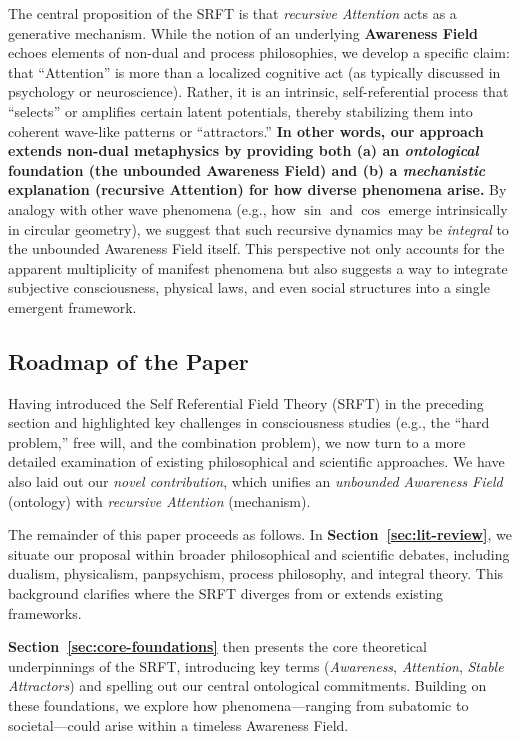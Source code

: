 \documentclass[12pt,a4paper]{article}
\begin{document}
The central proposition of the SRFT is that \emph{recursive Attention} acts as a generative mechanism. While the notion of an underlying \textbf{Awareness Field} echoes elements of non-dual and process philosophies, we develop a specific claim: that ``Attention'' is more than a localized cognitive act (as typically discussed in psychology or neuroscience). Rather, it is an intrinsic, self-referential process that “selects” or amplifies certain latent potentials, thereby stabilizing them into coherent wave-like patterns or “attractors.” \textbf{In other words, our approach extends non-dual metaphysics by providing both (a) an \emph{ontological} foundation (the unbounded Awareness Field) and (b) a \emph{mechanistic} explanation (recursive Attention) for how diverse phenomena arise.} By analogy with other wave phenomena (e.g., how \(\sin\) and \(\cos\) emerge intrinsically in circular geometry), we suggest that such recursive dynamics may be \emph{integral} to the unbounded Awareness Field itself. This perspective not only accounts for the apparent multiplicity of manifest phenomena but also suggests a way to integrate subjective consciousness, physical laws, and even social structures into a single emergent framework.

\subsection{Roadmap of the Paper}

Having introduced the Self Referential Field Theory (SRFT) in the preceding section and highlighted key challenges in consciousness studies (e.g., the “hard problem,” free will, and the combination problem), we now turn to a more detailed examination of existing philosophical and scientific approaches. We have also laid out our \emph{novel contribution}, which unifies an \emph{unbounded Awareness Field} (ontology) with \emph{recursive Attention} (mechanism). 

The remainder of this paper proceeds as follows. In \textbf{Section~\ref{sec:lit-review}}, we situate our proposal within broader philosophical and scientific debates, including dualism, physicalism, panpsychism, process philosophy, and integral theory. This background clarifies where the SRFT 
diverges from or extends existing frameworks.

\textbf{Section~\ref{sec:core-foundations}} then presents the core theoretical underpinnings of the SRFT, introducing key terms (\emph{Awareness}, \emph{Attention}, \emph{Stable Attractors}) 
and spelling out our central ontological commitments. Building on these foundations, we explore how phenomena—ranging from subatomic to societal—could arise within a timeless Awareness Field.
\end{document}

